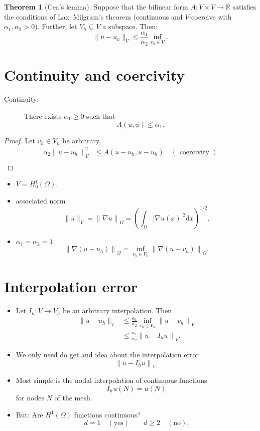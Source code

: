 \documentclass[
	a4paper,
	11pt,
	oneside
]{scrreprt}
\theoremstyle{definition}
\newtheorem{theorem}{Theorem}
\begin{document}
\begin{theorem}[Cea's lemma]
Suppose that the bilinear form $A\colon V\times V\rightarrow\mathbb{R}$ satisfies the conditions of \linebreak Lax--Milgram's theorem (continuous and $V$-coercive with $\alpha_{1},\alpha_{2}>0$). Further, let $V_{h}\subseteq V$ a subspace. Then: \[ \|u-u_{h}\|_{V}\le \frac{\alpha_{1}}{\alpha_{2}}\inf_{v_h\in V}. \]
\end{theorem}

\section{Continuity and coercivity}

\begin{description}
	\item[Continuity:] There exists $\alpha_{1}\ge0$ such that \[ A\left(u,\phi\right)\le\alpha_{1}. \]
\end{description}

\begin{proof}
Let $v_{h}\in V_{h}$ be arbitrary,
\begin{align*}
	\alpha_{2}{\|u-u_{h}\|}^{2}_{V}	&\le A\left(u-u_{h}, u-u_{h}\right)\quad (\text{ coercivity })\\
																	&
\end{align*}
\end{proof}

\begin{itemize}
	\item $V=H^{1}_{0}(\Omega)$.
	\item associated norm \[ \|u\|_{V}={\|\nabla u\|}_{\Omega}={\left(\int_{\Omega}{|\nabla u(x)|}^{2}\mathrm{d}x\right)}^{1/2}. \]
	\item $\alpha_{1}=\alpha_{2}=1$ \[ {\|\nabla\left(u-u_{h}\right)\|}_{\Omega}=\inf_{v_{h}\in V_{h}}{\|\nabla\left(u-v_{h}\right)\|}_{\Omega}. \]
\end{itemize}

\section{Interpolation error}

\begin{itemize}
	\item Let $I_{h}\colon V\rightarrow V_{h}$ be an arbitrary interpolation. Then
	\begin{align*}
	\|u-u_h\|_{V}	&\le\frac{\alpha_1}{\alpha_2}\inf_{v_h\in V_h}{\|u-v_h\|}_{V}\\
								&\le \frac{\alpha_1}{\alpha_2}{\|u-I_hu\|}_{V}.
	\end{align*}
	\item We only need do get and idea about the interpolation error \[ {\|u-I_{h}u\|}_{V}. \]
	\item Most simple is the nodal interpolation of continuous functions \[ I_{h}u(N)=u(N) \] for nodes $N$ of the mesh.
	\item But: Are $H^{1}(\Omega)$ functions continuous? \[ d=1\quad\left(\text{yes}\right)\qquad d\ge2\quad\left(\text{no}\right). \]
\end{itemize}
\end{document}
